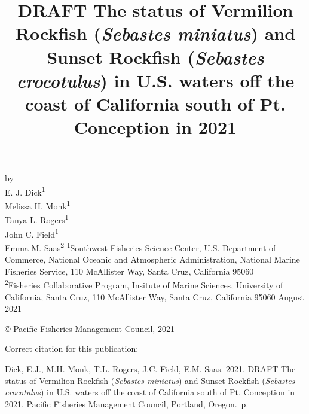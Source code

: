 \documentclass[11pt,
  english,
  a4paper,
]{article}
\date{}
\newcommand{\trTitle}{DRAFT The status of Vermilion Rockfish (\emph{Sebastes miniatus}) and Sunset Rockfish (\emph{Sebastes crocotulus}) in U.S. waters off the coast of California south of Pt. Conception in 2021}
\newcommand{\trYear}{2021}
\newcommand{\trMonth}{August}
\newcommand{\trAuthsBack}{Dick, E.J., M.H. Monk, T.L. Rogers, J.C. Field, E.M. Saas}
\newcommand{\trCitation}{
\begin{hangparas}{1em}{1}
\trAuthsBack{}. \trYear{}. \trTitle{}. Pacific Fisheries Management Council, Portland, Oregon. \pageref{LastPage}{}\,p.
\end{hangparas}}
\begin{document}

\renewcommand*{\thefootnote}{\fnsymbol{footnote}}

\small
\thispagestyle{empty}
\noindent
\begin{center}
\title{DRAFT The status of Vermilion Rockfish (\emph{Sebastes miniatus}) and Sunset Rockfish (\emph{Sebastes crocotulus}) in U.S. waters off the coast of California south of Pt. Conception in 2021}
\vspace{1.5cm}
{\Large\textbf{}}
\vfill
by\\
E. J. Dick\textsuperscript{1}\\
Melissa H. Monk\textsuperscript{1}\\
Tanya L. Rogers\textsuperscript{1}\\
John C. Field\textsuperscript{1}\\
Emma M. Saas\textsuperscript{2}\vfill
\textsuperscript{1}Southwest Fisheries Science Center, U.S. Department of Commerce, National Oceanic and Atmospheric Administration, National Marine Fisheries Service, 110 McAllister Way, Santa Cruz, California 95060\\
\textsuperscript{2}Fisheries Collaborative Program, Insitute of Marine Sciences, University of California, Santa Cruz, 110 McAllister Way, Santa Cruz, California 95060\vfill
\trMonth{} \trYear{}
\end{center}
\clearpage

\thispagestyle{empty}
\vspace*{\fill}
\begin{center}
\copyright{} Pacific Fisheries Management Council, \trYear{}\\
\end{center}
\par
\bigskip
\noindent
Correct citation for this publication:
\bigskip
\par
\trCitation{}
\clearpage


\tableofcontents\clearpage
\label{TRlastRoman}
\clearpage
\end{document}
